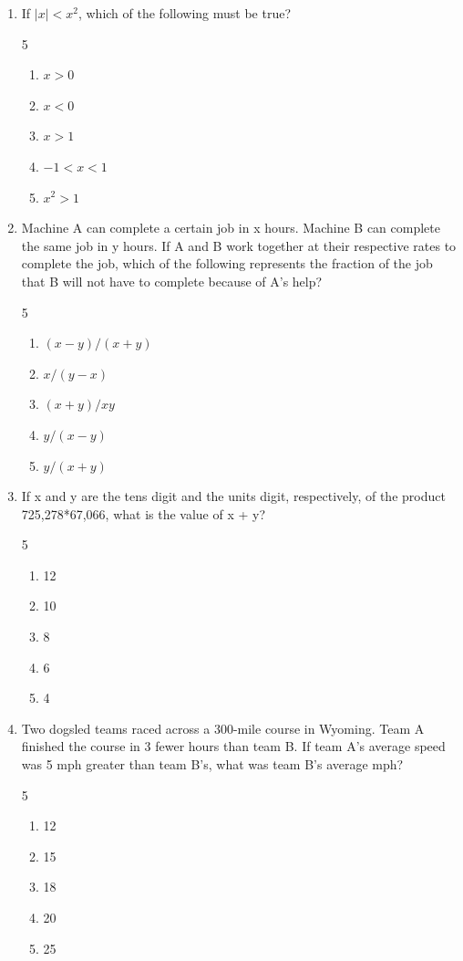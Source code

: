 \documentclass[12pt]{article}
\begin{document}
\begin{enumerate}
\item If $|x| < x^2$, which of the following must be true?
\begin{multicols}{5}
\begin{enumerate}[label=(\Alph*)]
\item $x > 0$
\item $x < 0$
\item $x > 1$
\item $-1 < x < 1$
\item $x^2 > 1$
\end{enumerate}
\end{multicols}

\item Machine A can complete a certain job in x hours. Machine B can complete the same job in y hours. If A and B work together at their respective rates to complete the job, which of the following represents the fraction of the job that B will not have to complete because of A's help?
\begin{multicols}{5}
\begin{enumerate}[label=(\Alph*)]
\item $(x - y)/(x + y)$
\item $x/(y - x)$
\item $(x + y)/xy$
\item $y/(x - y)$
\item $y/(x + y)$
\end{enumerate}
\end{multicols}

\item If x and y are the tens digit and the units digit, respectively, of the product 725,278*67,066, what is the value of x + y?
\begin{multicols}{5}
\begin{enumerate}[label=(\Alph*)]
\item 12
\item 10
\item 8
\item 6
\item 4
\end{enumerate}
\end{multicols}

\item Two dogsled teams raced across a 300-mile course in Wyoming. Team A finished the course in 3 fewer hours than team B. If team A's average speed was 5 mph greater than team B's, what was team B's average mph?
\begin{multicols}{5}
\begin{enumerate}[label=(\Alph*)]
\item 12
\item 15
\item 18
\item 20
\item 25
\end{enumerate}
\end{multicols}


\end{enumerate}
\end{document}
